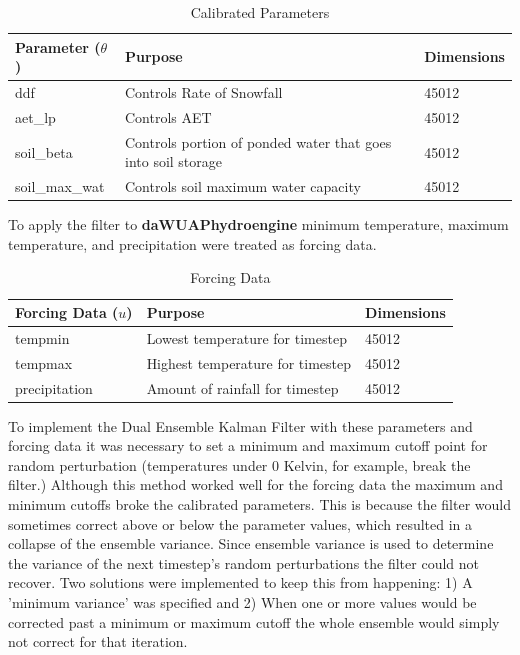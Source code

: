 \begin{table}[]
\caption{Calibrated Parameters} 
\begin{tabular}{lll}
Parameter ($\theta$) & Purpose                                                    & Dimensions  \\ \hline
ddf                  & Controls Rate of Snowfall                                        & 45012 \\
aet\_lp              & Controls AET                                                      & 45012 \\
soil\_beta           & Controls portion of ponded water that goes into soil storage & 45012 \\
soil\_max\_wat       & Controls soil maximum water capacity & 45012
\end{tabular}
\label{tab:t_params}
\end{table}

To apply the filter to \textbf{daWUAPhydroengine} minimum temperature, maximum temperature, and precipitation were treated as forcing data. 


\begin{table}[]
\caption{Forcing Data} 
\begin{tabular}{lll}
Forcing Data ($u$) & Purpose                          & Dimensions \\ \hline
tempmin          & Lowest temperature for timestep  & 45012 \\
tempmax          & Highest temperature for timestep & 45012 \\
precipitation      & Amount of rainfall for timestep & 45012 
\end{tabular}
\label{tab:u_params}
\end{table}


To implement the Dual Ensemble Kalman Filter with these parameters and forcing data it was necessary to set a minimum and maximum cutoff point for random perturbation (temperatures under 0 Kelvin, for example, break the filter.) Although this method worked well  for the forcing data the maximum and minimum cutoffs broke the calibrated parameters. This is because the filter would sometimes correct above or below the parameter values, which resulted in a collapse of the ensemble variance. Since ensemble variance is used to determine the variance of the next timestep's random perturbations the filter could not recover. Two solutions were implemented to keep this from happening: 1) A 'minimum variance' was specified and 2) When one or more values would be corrected past a minimum or maximum cutoff the whole ensemble would simply not correct for that iteration.

